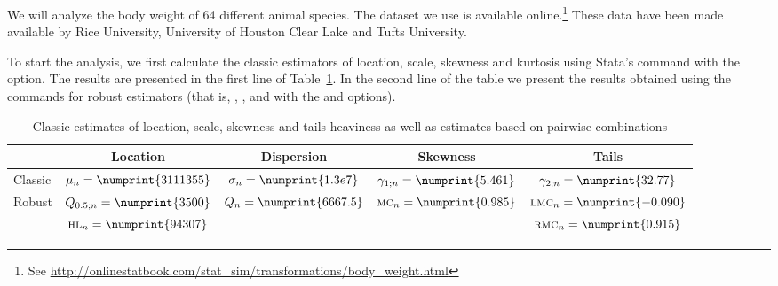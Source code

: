 \begin{stexample}                                                               
We will analyze the body weight of 64 different animal species. The dataset we
use is available online.\footnote{See
\url{http://onlinestatbook.com/stat\_sim/transformations/body\_weight.html}}
These data have been made available by Rice University, University of Houston
Clear Lake and Tufts University.

To start the analysis, we first calculate the classic estimators of
location, scale, skewness and kurtosis using Stata's  command
with the  option. The results are presented in the first line
of Table~\ref{tab:estimates_original_data}. In the second line of the table we
present the results obtained using the commands for robust estimators (that is,
, ,  and  with the
 and  options).

\begin{table}[h!]
    \centering
    \caption{Classic estimates of location, scale, skewness and tails heaviness
    as well as estimates based on pairwise combinations}
    \label{tab:estimates_original_data}
    \begin{tabular}{lcccc}
        \toprule
                  & Location 
                  & Dispersion 
                  & Skewness 
                  & Tails
        \\\midrule
        Classic   & $\mu_n          = \numprint{3111355}$ 
                  & $\sigma_n       = \numprint{1.3e7}$ 
                  & $\gamma_{1;n}   = \numprint{5.461}$ 
                  & $\gamma_{2;n}   = \numprint{32.77}$
        \\\addlinespace
        Robust    & $Q_{0.5;n}      = \numprint{3500}$
                  & $Q_n            = \numprint{6667.5}$
                  & $\stsc{MC}_n    = \numprint{0.985}$
                  & $\stsc{LMC}_n   = \numprint{-0.090}$
        \\
                  & $\stsc{HL}_n    = \numprint{94307}$
                  &
                  &
                  & $\stsc{RMC}_n   = \numprint{0.915}$
        \\\bottomrule
    \end{tabular}
\end{table}


\end{stexample}
